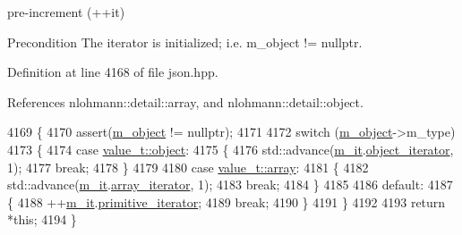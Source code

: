 pre-\/increment (++it) 

\begin{DoxyPrecond}{Precondition}
The iterator is initialized; i.\+e. {\ttfamily m\+\_\+object != nullptr}. 
\end{DoxyPrecond}


Definition at line 4168 of file json.\+hpp.



References nlohmann\+::detail\+::array, and nlohmann\+::detail\+::object.


\begin{DoxyCode}
4169     \{
4170         assert(\hyperlink{classnlohmann_1_1detail_1_1iter__impl_aca84f84be598bdfaaddd23d928c42bbb}{m\_object} != \textcolor{keyword}{nullptr});
4171 
4172         \textcolor{keywordflow}{switch} (\hyperlink{classnlohmann_1_1detail_1_1iter__impl_aca84f84be598bdfaaddd23d928c42bbb}{m\_object}->m\_type)
4173         \{
4174             \textcolor{keywordflow}{case} \hyperlink{namespacenlohmann_1_1detail_a1ed8fc6239da25abcaf681d30ace4985aa8cfde6331bd59eb2ac96f8911c4b666}{value\_t::object}:
4175             \{
4176                 std::advance(\hyperlink{classnlohmann_1_1detail_1_1iter__impl_a8a86a7c0d4af0cc4ab345b6f0e13cdfa}{m\_it}.\hyperlink{structnlohmann_1_1detail_1_1internal__iterator_a8cb0af3498061426c1d0a65ad6220408}{object\_iterator}, 1);
4177                 \textcolor{keywordflow}{break};
4178             \}
4179 
4180             \textcolor{keywordflow}{case} \hyperlink{namespacenlohmann_1_1detail_a1ed8fc6239da25abcaf681d30ace4985af1f713c9e000f5d3f280adbd124df4f5}{value\_t::array}:
4181             \{
4182                 std::advance(\hyperlink{classnlohmann_1_1detail_1_1iter__impl_a8a86a7c0d4af0cc4ab345b6f0e13cdfa}{m\_it}.\hyperlink{structnlohmann_1_1detail_1_1internal__iterator_a8294a6e6f01b58e1cce8fbae66a50b5d}{array\_iterator}, 1);
4183                 \textcolor{keywordflow}{break};
4184             \}
4185 
4186             \textcolor{keywordflow}{default}:
4187             \{
4188                 ++\hyperlink{classnlohmann_1_1detail_1_1iter__impl_a8a86a7c0d4af0cc4ab345b6f0e13cdfa}{m\_it}.\hyperlink{structnlohmann_1_1detail_1_1internal__iterator_a2b3bb45f968210e42c282017eeeb63a8}{primitive\_iterator};
4189                 \textcolor{keywordflow}{break};
4190             \}
4191         \}
4192 
4193         \textcolor{keywordflow}{return} *\textcolor{keyword}{this};
4194     \}
\end{DoxyCode}
\mbox{\label{classnlohmann_1_1detail_1_1iter__impl_a3eef94f9d167046e7f773aeb6b78090c}} 

